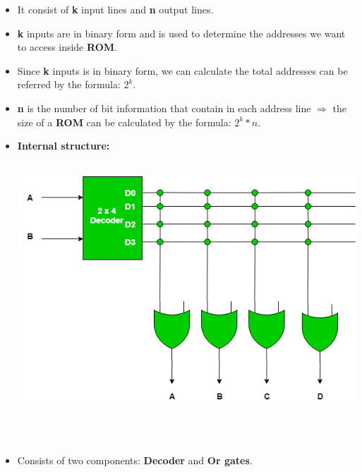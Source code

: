 \documentclass [12pt]{article}
\begin{document}
\begin {itemize}


				
					\item It consist of \textbf{k} input lines and \textbf{n} output lines. 
					
					\item \textbf{k} inputs are in binary form and is used to determine the addresses we want to access inside \textbf{ROM}.
					
					\item Since \textbf{k} inputs is in binary form, we can calculate the total addresses can be referred by the formula: $2^k$.
					
					\item \textbf{n} is the number of bit information that contain in each address line $\Rightarrow$ the size of a \textbf{ROM} can be calculated by the formula: $2^k * n$.
					
					\item \textbf{Internal structure: }\\~\\
					\centerline{\includegraphics[scale = 0.5]{rom_internal.png}}\\~\\
					
					\item Consists of two components: \textbf{Decoder} and \textbf{Or gates}.
					
					\end {itemize}
\end{document}
